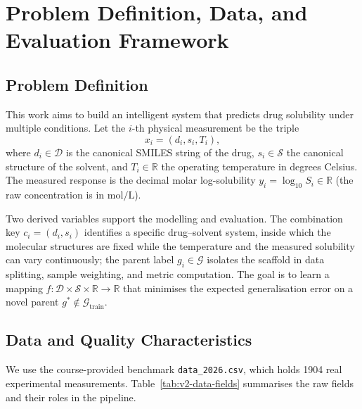 \section{Problem Definition, Data, and Evaluation Framework}\label{sec:v2-data}

\subsection{Problem Definition}\label{sec:v2-common-problem}

This work aims to build an intelligent system that predicts drug solubility under multiple conditions. Let the $i$-th physical measurement be the triple
\begin{equation}
x_i = (d_i, s_i, T_i),
\end{equation}
where $d_i \in \mathcal{D}$ is the canonical SMILES string of the drug, $s_i \in \mathcal{S}$ the canonical structure of the solvent, and $T_i \in \mathbb{R}$ the operating temperature in degrees Celsius. The measured response is the decimal molar log-solubility $y_i = \log_{10} S_i \in \mathbb{R}$ (the raw concentration is in $\mathrm{mol/L}$).

Two derived variables support the modelling and evaluation. The combination key $c_i = (d_i, s_i)$ identifies a specific drug--solvent system, inside which the molecular structures are fixed while the temperature and the measured solubility can vary continuously; the parent label $g_i \in \mathcal{G}$ isolates the scaffold in data splitting, sample weighting, and metric computation. The goal is to learn a mapping $f: \mathcal{D} \times \mathcal{S} \times \mathbb{R} \to \mathbb{R}$ that minimises the expected generalisation error on a novel parent $g^* \notin \mathcal{G}_{\mathrm{train}}$.

\subsection{Data and Quality Characteristics}

We use the course-provided benchmark \texttt{data\_2026.csv}, which holds 1904 real experimental measurements. Table~\ref{tab:v2-data-fields} summarises the raw fields and their roles in the pipeline.

